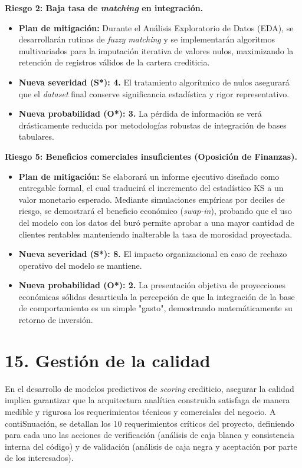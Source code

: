 \documentclass[
11pt, %
]{charter}
\begin{document}
\textbf{Riesgo 2: Baja tasa de \textit{matching} en integración.}
\begin{itemize}
    \item \textbf{Plan de mitigación:} Durante el Análisis Exploratorio de Datos (EDA), se desarrollarán rutinas de \textit{fuzzy matching} y se implementarán algoritmos multivariados para la imputación iterativa de valores nulos, maximizando la retención de registros válidos de la cartera crediticia.
    \item \textbf{Nueva severidad (S*): 4.} El tratamiento algorítmico de nulos asegurará que el \textit{dataset} final conserve significancia estadística y rigor representativo.
    \item \textbf{Nueva probabilidad (O*): 3.} La pérdida de información se verá drásticamente reducida por metodologías robustas de integración de bases tabulares.
\end{itemize}

\textbf{Riesgo 5: Beneficios comerciales insuficientes (Oposición de Finanzas).}
\begin{itemize}
    \item \textbf{Plan de mitigación:} Se elaborará un informe ejecutivo diseñado como entregable formal, el cual traducirá el incremento del estadístico KS a un valor monetario esperado. Mediante simulaciones empíricas por deciles de riesgo, se demostrará el beneficio económico (\textit{swap-in}), probando que el uso del modelo con los datos del buró permite aprobar a una mayor cantidad de clientes rentables manteniendo inalterable la tasa de morosidad proyectada.
    \item \textbf{Nueva severidad (S*): 8.} El impacto organizacional en caso de rechazo operativo del modelo se mantiene.
    \item \textbf{Nueva probabilidad (O*): 2.} La presentación objetiva de proyecciones económicas sólidas desarticula la percepción de que la integración de la base de comportamiento es un simple "gasto", demostrando matemáticamente su retorno de inversión.
\end{itemize}


\section{15. Gestión de la calidad}
\label{sec:calidad}

En el desarrollo de modelos predictivos de \textit{scoring} crediticio, asegurar la calidad implica garantizar que la arquitectura analítica construida satisfaga de manera medible y rigurosa los requerimientos técnicos y comerciales del negocio. A contiSnuación, se detallan los 10 requerimientos críticos del proyecto, definiendo para cada uno las acciones de verificación (análisis de caja blanca y consistencia interna del código) y de validación (análisis de caja negra y aceptación por parte de los interesados).
\end{document}
